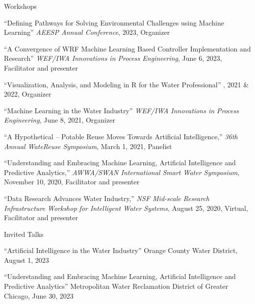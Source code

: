 \documentclass{resume} %
\begin{document}

\begin{rSection}{Workshops}

``Defining Pathways for Solving Environmental Challenges using Machine Learning'' \emph{AEESP Annual Conference}, 2023, Organizer

``A Convergence of WRF Machine Learning Based Controller Implementation and Research'' \emph{WEF/IWA Innovations in Process Engineering}, June 6, 2023, Facilitator and presenter

``Visualization, Analysis, and Modeling in R for the Water Professional'' , 2021 \& 2022, Organizer

``Machine Learning in the Water Industry'' \emph{WEF/IWA Innovations in Process Engineering}, June 8, 2021, Organizer

``A Hypothetical – Potable Reuse Moves Towards Artificial Intelligence,'' \emph{36th Annual WateReuse Symposium}, March 1, 2021, Panelist

``Understanding and Embracing Machine Learning, Artificial Intelligence and Predictive Analytics,'' \emph{AWWA/SWAN International Smart Water Symposium}, November 10, 2020, Facilitator and presenter

``Data Research Advances Water Industry,'' \emph{NSF Mid-scale Research Infrastructure Workshop for Intelligent Water Systems}, August 25, 2020, Virtual, Facilitator and presenter

\end{rSection}

\begin{rSection}{Invited Talks}

``Artificial Intelligence in the Water Industry'' Orange County Water District, August 1, 2023

``Understanding and Embracing Machine Learning, Artificial Intelligence and Predictive Analytics'' Metropolitan Water Reclamation District of Greater Chicago, June 30, 2023

\end{rSection}


\end{document}
